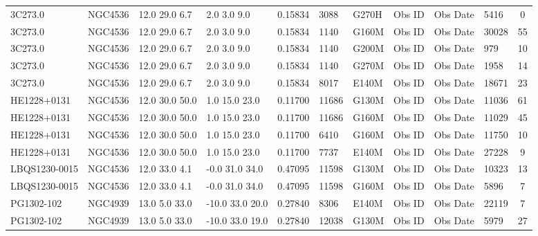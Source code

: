 \documentclass[iop]{emulateapj-rtx4}
\begin{document}
\begin{table}[ht]
\begin{center}
\begin{tabular}{l l l l l l l l l l c}
3C273.0  					&      NGC4536  	&       12.0  29.0  6.7  &    2.0  3.0  9.0  &       0.15834  & 3088  &    G270H  &   Obs ID  & Obs Date  & 5416  &       0            \\
3C273.0  					&      NGC4536  	&       12.0  29.0  6.7  &    2.0  3.0  9.0  &       0.15834  & 1140  &    G160M  &   Obs ID  & Obs Date  & 30028  &      55         \\
3C273.0  					&      NGC4536  	&       12.0  29.0  6.7  &    2.0  3.0  9.0  &       0.15834  & 1140  &    G200M  &   Obs ID  & Obs Date  & 979  &        10           \\
3C273.0  					&      NGC4536  	&       12.0  29.0  6.7  &    2.0  3.0  9.0  &       0.15834  & 1140  &    G270M  &   Obs ID  & Obs Date  & 1958  &       14          \\
3C273.0  					&      NGC4536  	&       12.0  29.0  6.7  &    2.0  3.0  9.0  &       0.15834  & 8017  &    E140M  &   Obs ID  & Obs Date  & 18671  &      23         \\
HE1228+0131  				&      NGC4536  &       12.0  30.0  50.0  &   1.0  15.0  23.0  &     0.11700  & 11686  &   G130M  &   Obs ID  & Obs Date  & 11036  &      61          \\
HE1228+0131  				&             NGC4536  &       12.0  30.0  50.0  &   1.0  15.0  23.0  &     0.11700  & 11686  &   G160M  &   Obs ID  & Obs Date  & 11029  &      45          \\
HE1228+0131  				&             NGC4536  &       12.0  30.0  50.0  &   1.0  15.0  23.0  &     0.11700  & 6410  &    G160M  &   Obs ID  & Obs Date  & 11750  &      10           \\
HE1228+0131  				&             NGC4536  &       12.0  30.0  50.0  &   1.0  15.0  23.0  &     0.11700  & 7737  &    E140M  &   Obs ID  & Obs Date  & 27228  &      9            \\
LBQS1230-0015  			&           NGC4536  &       12.0  33.0  4.1  &    -0.0  31.0  34.0  &    0.47095  & 11598  &   G130M  &   Obs ID  & Obs Date  & 10323  &      13          \\
LBQS1230-0015  			&           NGC4536  &       12.0  33.0  4.1  &    -0.0  31.0  34.0  &    0.47095  & 11598  &   G160M  &   Obs ID  & Obs Date  & 5896  &       7            \\
PG1302-102  &              NGC4939  &       13.0  5.0  33.0  &    -10.0  33.0  20.0  &   0.27840  & 8306  &    E140M  &   Obs ID  & Obs Date  & 22119  &      7            \\
PG1302-102  &              NGC4939  &       13.0  5.0  33.0  &    -10.0  33.0  19.0  &   0.27840  & 12038  &   G130M  &   Obs ID  & Obs Date  & 5979  &       27          \\

\end{tabular}
\end{center}
\end{table}
\end{document}
